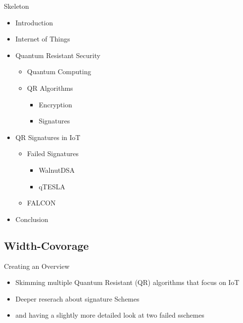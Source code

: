 \documentclass[ucs,10pt]{beamer}
\begin{document}
\begin{frame}{Skeleton}
  \begin{itemize}
      \item Introduction
    
      \item Internet of Things
      
      \item Quantum Resistant Security
          \begin{itemize}
            \item Quantum Computing
            \item QR Algorithms
            \begin{itemize}
              \item Encryption
              \item Signatures
            \end{itemize}
          \end{itemize}
      
      \item QR Signatures in IoT 
      \begin{itemize}
        \item Failed Signatures
        \begin{itemize}
          \item WalnutDSA
          \item qTESLA
        \end{itemize}
        \item FALCON
      \end{itemize}
      
      
      \item {Conclusion}
  \end{itemize}
  
\end{frame}

\subsection{Width-Covorage}
\begin{frame}{Creating an Overview}
  \begin{itemize}
    \item Skimming multiple Quantum Resistant (QR) algorithms \cite{QR_algs,PQClean-GH} that focus on IoT \cite{QR_comparison,Energy_comp,QR_Iot_Lattice,QR_IoT,QR_IoT_Energy} 
    \item Deeper reserach about signature Schemes \cite{QR_sigs}
    \item and having a slightly more detailed look at two failed sschemes \cite{WalnutDSA,WalnutDSA_broken,qtesla,qtesla_masked}
    
  \end{itemize}
\end{frame}
\end{document}

